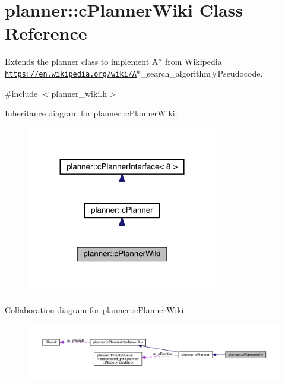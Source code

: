\hypertarget{classplanner_1_1c_planner_wiki}{}\section{planner\+:\+:c\+Planner\+Wiki Class Reference}
\label{classplanner_1_1c_planner_wiki}


Extends the planner class to implement A$\ast$ from Wikipedia \href{https://en.wikipedia.org/wiki/A}{\tt https\+://en.\+wikipedia.\+org/wiki/A}$\ast$\+\_\+search\+\_\+algorithm\#\+Pseudocode.  




{\ttfamily \#include $<$planner\+\_\+wiki.\+h$>$}



Inheritance diagram for planner\+:\+:c\+Planner\+Wiki\+:\nopagebreak
\begin{figure}[H]
\begin{center}
\leavevmode
\includegraphics[width=236pt]{classplanner_1_1c_planner_wiki__inherit__graph}
\end{center}
\end{figure}


Collaboration diagram for planner\+:\+:c\+Planner\+Wiki\+:\nopagebreak
\begin{figure}[H]
\begin{center}
\leavevmode
\includegraphics[width=350pt]{classplanner_1_1c_planner_wiki__coll__graph}
\end{center}
\end{figure}
